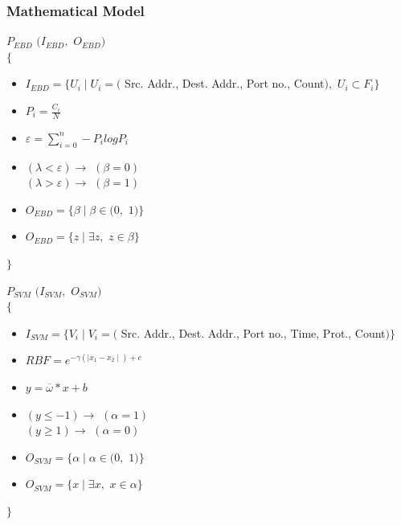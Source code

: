 \documentclass[10pt]{beamer}
\begin{document}
\begin{frame}
\frametitle{Mathematical Model}
\footnotesize
$P_{EBD} $ $ (I_{EBD},$ $O_{EBD})$\\
$\lbrace$


\begin{itemize}
\item $I_{EBD} = \lbrace U_{i} \mid U_{i} = ($ Src. Addr., Dest. Addr., Port no., Count$),  $ $ U_{i}  \subset F_{i} \rbrace$

\item $P_{i} = \frac{C_{i}}{N}$  

\item $\varepsilon = \sum_{i=0}^{n} - P_{i} log P_{i}$

\item $(\lambda < \varepsilon) \rightarrow  $ $ (\beta = 0)$ \\ $(\lambda > \varepsilon) \rightarrow  $ $ (\beta = 1)$

\item $ O_{EBD} = \lbrace \beta \mid \beta \in (0, $ $1) \rbrace$

\item $O_{EBD} = \lbrace z \mid \exists z, $ $ z \in \beta \rbrace$ \\

\end{itemize}
$ \rbrace$
\newline

$P_{SVM} $ $ (I_{SVM},$ $O_{SVM})$\\
$\lbrace$
\indent
\begin{itemize}
\item $I_{SVM} = \lbrace V_{i} \mid V_{i} = ($ Src. Addr., Dest. Addr., Port no., Time, Prot., Count$) \rbrace$

\item $RBF = e^{-\gamma(\mid x_{1}-x_{2} \mid)+c}$ 

\item $y = \overline{\omega} * x + b$ 

\item $(y \leq -1) \rightarrow  $ $ (\alpha = 1)$ \\ $(y \geq 1) \rightarrow  $ $ (\alpha = 0)$

\item $ O_{SVM} = \lbrace \alpha \mid \alpha \in (0, $ $1) \rbrace$

\item $O_{SVM} = \lbrace x \mid \exists x, $ $ x \in \alpha \rbrace$ \\

\end{itemize}
$ \rbrace$

\end{frame}
\end{document}
